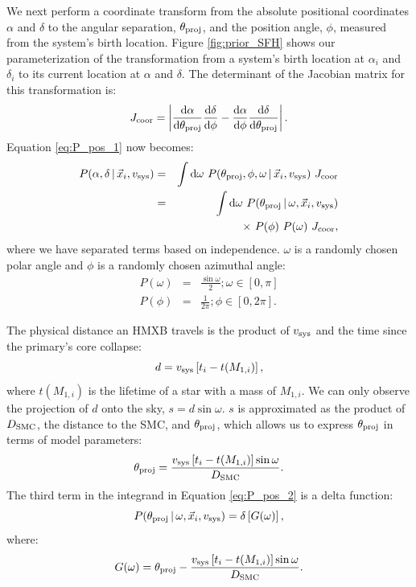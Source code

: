 \documentclass[usenatbib]{mnras}
\newcommand{\given}{\,|\,}
\newcommand{\dd}{\mathrm{d}}
\begin{document}
We next perform a coordinate transform from the absolute positional coordinates $\alpha$ and $\delta$ to the angular separation, $\theta_{\rm proj}$, and the position angle, $\phi$, measured from the system's birth location. Figure \ref{fig:prior_SFH} shows our parameterization of the transformation from a system's birth location at $\alpha_i$ and $\delta_i$ to its current location at $\alpha$ and $\delta$. The determinant of the Jacobian matrix for this transformation is:
\begin{equation}
J_{\rm coor} = \left| \frac{\dd \alpha}{\dd \theta_{\rm proj}} \frac{\dd \delta}{\dd \phi} - \frac{\dd \alpha}{\dd \phi} \frac{\dd \delta}{\dd \theta_{\rm proj}} \right|.
\end{equation}
Equation \ref{eq:P_pos_1} now becomes:
\begin{eqnarray}
P(\alpha, \delta \given \vec{x}_i, v_{\rm sys} ) &=& \int \dd \omega\ P(\theta_{\rm proj}, \phi, \omega \given \vec{x}_i, v_{\rm sys} )\ J_{\rm coor} \nonumber \\
&=& \int \dd \omega\ P(\theta_{\rm proj} \given \omega,  \vec{x}_i, v_{\rm sys} ) \nonumber \\
& & \qquad \times\ P(\phi)\ P(\omega)\ J_{\rm coor}, \label{eq:P_pos_2}
\end{eqnarray}
where we have separated terms based on independence. $\omega$ is a randomly chosen polar angle and $\phi$ is a randomly chosen azimuthal angle: 
\begin{eqnarray}
P(\omega) &=& \frac{\sin \omega} {2}; \omega \in [0,\pi] \\
P(\phi) &=& \frac{1}{2 \pi}; \phi \in [0, 2\pi].
\end{eqnarray}


The physical distance an HMXB travels is the product of $v_{\rm sys}$ and the time since the primary's core collapse:
\begin{equation}
d = v_{\rm sys} \left[t_i - t(M_{1,i}) \right],
\end{equation}
where $t(M_{1,i})$ is the lifetime of a star with a mass of $M_{1,i}$. We can only observe the projection of $d$ onto the sky, $s = d \sin \omega$. $s$ is approximated as the product of $D_{\rm SMC}$, the distance to the SMC, and $\theta_{\rm proj}$, which allows us to express $\theta_{\rm proj}$ in terms of model parameters:
\begin{equation}
\theta_{\rm proj} = \frac{v_{\rm sys} \left[ t_i - t(M_{1,i}) \right] \sin \omega}{D_{\rm SMC}}. \label{eq:theta_proj}
\end{equation}
The third term in the integrand in Equation \ref{eq:P_pos_2} is a delta function:
\begin{equation}
P(\theta_{\rm proj} \given \omega, \vec{x}_i, v_{\rm sys}) = \delta \left[G(\omega)\right], \label{eq:P_theta_proj}
\end{equation}
where:
\begin{equation}
G(\omega) = \theta_{\rm proj} - \frac{v_{\rm sys} \left[t_i - t(M_{1,i}) \right] \sin \omega}{D_{\rm SMC}}.\end{equation}
\end{document}
